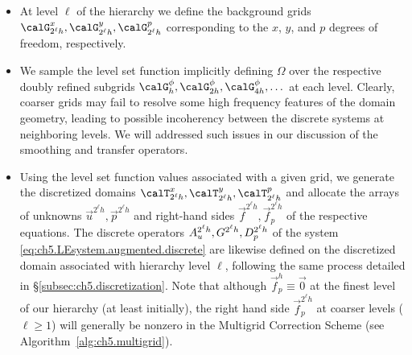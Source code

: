 \begin{itemize}

\item At level $\ell$ of the hierarchy we define the background grids $\calG^x_{2^{\ell}h}, \calG^y_{2^{\ell}h}, \calG^p_{2^{\ell}h}$ corresponding to the $x$, $y$, and $p$ degrees of freedom, respectively.

\item We sample the level set function implicitly defining $\Omega$ over the respective doubly refined subgrids $\calG^\phi_h, \calG^\phi_{2h}, \calG^\phi_{4h}, \dotsc$ at each level. Clearly, coarser grids may fail to resolve some high frequency features of the domain geometry, leading to possible incoherency between the discrete systems at neighboring levels. We will addressed such issues in our discussion of the smoothing and transfer operators.

\item Using the level set function values associated with a given grid, we generate the discretized domains $\calT^x_{2^{\ell}h}, \calT^y_{2^{\ell}h}, \calT^p_{2^{\ell}h}$ and allocate the arrays of unknowns $\vec{u}^{2^{\ell}h}, \vec{p}^{2^{\ell}h}$ and right-hand sides $\vec{f}^{2^{\ell}h}, \vec{f}_p^{2^{\ell}h}$ of the respective equations. The discrete operators $A_u^{2^{\ell}h}, \linebreak[0] G^{2^{\ell}h}, \linebreak[0] D_p^{2^{\ell}h}$ of the system \eqref{eq:ch5.LEsystem.augmented.discrete} are likewise defined on the discretized domain associated with hierarchy level $\ell$, following the same process detailed in \S\ref{subsec:ch5.discretization}. Note that although $\vec{f}_p^h \equiv \vec{0}$ at the finest level of our hierarchy (at least initially), the right hand side $\vec{f}_p^{2^{\ell}h}$ at coarser levels ($\ell \geq 1$) will generally be nonzero in the Multigrid Correction Scheme (see Algorithm~\ref{alg:ch5.multigrid}).

\end{itemize}

